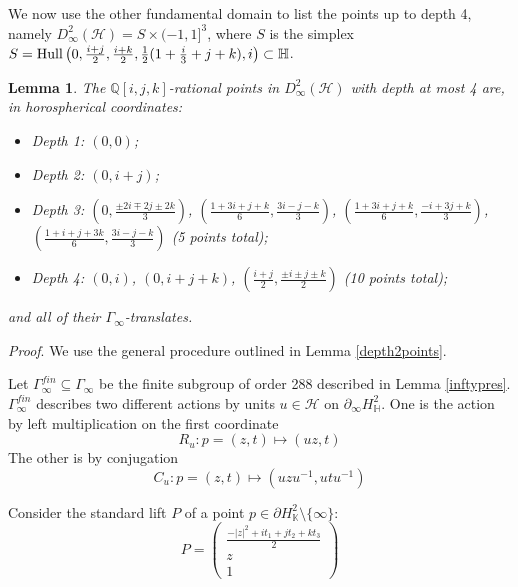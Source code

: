 \documentclass{article}[12pt]
\newcommand{\Q}{\mathbb{Q}}
\newtheorem{lem}{Lemma}%
\newcommand{\Pf}{{\em Proof}. }
\begin{document}
We now use the other fundamental domain to list the points up to depth 4, namely $D^2_\infty(\mathcal{H}) = S\times (-1,1]^3$, where $S$ is the simplex
$S={\rm Hull}\left(0,\frac{i+j}{2},\frac{i+k}{2},\frac{1}{2}(1+\frac{i}{3}+j+k),i \right) \subset \mathbb{H}$.


\begin{lem}
The $\Q[i,j,k]$-rational points in $D^2_\infty(\mathcal{H})$ with depth at most 4 are, in horospherical coordinates:

\begin{itemize}
\item Depth 1: $(0,0)$;
\item Depth 2: $(0,i+j)$;
\item Depth 3: $(0,\frac{\pm 2i \mp 2j \pm 2k}{3})$, $(\frac{1+3i+j+k}{6},\frac{3i-j-k}{3})$, $(\frac{1+3i+j+k}{6},\frac{-i+3j+k}{3})$, $(\frac{1+i+j+3k}{6},\frac{3i-j-k}{3})$ (5 points total);
\item Depth 4: $(0,i)$, $(0,i+j+k)$, $(\frac{i+j}{2},\frac{\pm i \pm j \pm k}{2})$ (10 points total);
\end{itemize}
and all of their $\Gamma_\infty$-translates.

\end{lem}

\Pf We use the general procedure outlined in Lemma \ref{depth2points}.

Let $\Gamma_\infty^{fin}\subseteq \Gamma_\infty$ be the finite subgroup of order 288 described in Lemma \ref{inftypres}.  $\Gamma_\infty^{fin}$ describes two different actions by units $u\in\mathcal{H}$ on $\partial_\infty H_\mathbb{H}^2$.  One is the action by left multiplication on the first coordinate
$$R_u:p = (z,t) \mapsto (uz,t)$$
The other is by conjugation
$$C_u:p = (z,t)\mapsto (uzu^{-1},utu^{-1})$$

Consider the standard lift $P$ of a point $p\in \partial H_{\mathbb{K}}^2 \setminus \{ \infty \}$:
$$P = \left(\begin{array}{c}
\frac{-|z|^2+it_1+jt_2+kt_3}{2}\\z\\1
\end{array}\right)$$
\end{document}
